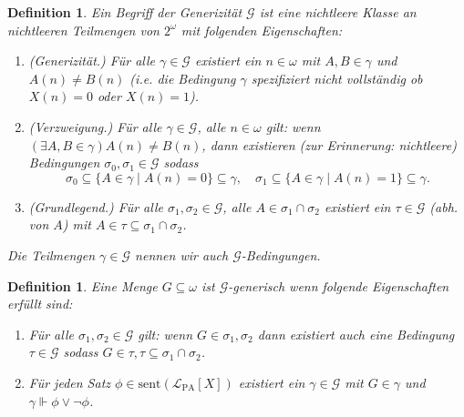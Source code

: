\documentclass[nofonts]{uebung}
\newtheorem{definition}[theorem]{Definition}
\begin{document}
\begin{definition}
    Ein \emph{Begriff der Generizität} $\mathcal G$ ist eine nichtleere Klasse an nichtleeren Teilmengen von $2^\omega$ mit folgenden Eigenschaften:
    \begin{enumerate}
        \item (Generizität.) Für alle $\gamma\in\mathcal G$ existiert ein $n\in\omega$ mit $A,B\in\gamma$ und $A(n)\neq B(n)$ (i.e. die Bedingung $\gamma$ spezifiziert nicht vollständig ob $X(n)=0$ oder $X(n)=1$).
        \item (Verzweigung.) Für alle $\gamma\in\mathcal G$, alle $n\in\omega$ gilt: wenn $(\exists A,B\in\gamma)A(n)\neq B(n)$, dann existieren (zur Erinnerung: nichtleere) Bedingungen $\sigma_0, \sigma_1\in\mathcal G$ sodass \[ \sigma_0\subseteq \{ A\in\gamma\mid A(n)=0 \}\subseteq\gamma,\quad \sigma_1\subseteq \{ A\in\gamma\mid A(n)=1 \}\subseteq\gamma. \]
        \item (Grundlegend.) Für alle $\sigma_1, \sigma_2\in\mathcal G$, alle $A\in\sigma_1\cap\sigma_2$ existiert ein $\tau\in\mathcal G$ (abh. von $A$) mit $A\in\tau\subseteq \sigma_1\cap\sigma_2$.
    \end{enumerate}
    Die Teilmengen $\gamma\in \mathcal G$ nennen wir auch $\mathcal G$-\emph{Bedingungen}.
\end{definition}

\begin{definition}
    Eine Menge $G\subseteq\omega$ ist \emph{$\mathcal G$-generisch} wenn folgende Eigenschaften erfüllt sind:
    \begin{enumerate}
        \item Für alle $\sigma_1, \sigma_2\in \mathcal G$ gilt: wenn $G\in \sigma_1, \sigma_2$ dann existiert auch eine Bedingung $\tau\in\mathcal G$ sodass $G\in\tau, \tau\subseteq\sigma_1\cap\sigma_2$.
        \item Für jeden Satz $\phi\in \mathrm{sent}(\mathcal L_{\mathrm{PA}}[X])$ existiert ein $\gamma\in\mathcal G$ mit $G\in \gamma$ und $\gamma\Vdash \phi\lor\neg\phi$.
    \end{enumerate}
\end{definition}
\end{document}

